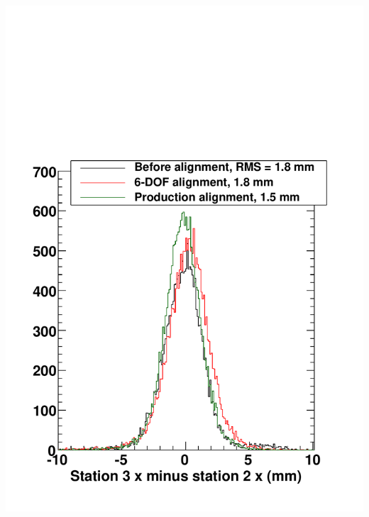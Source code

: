 \documentclass[compress]{beamer}
\begin{document}
\begin{frame}
\begin{columns}
\includegraphics[width=\linewidth]{residuals_xdifffid1cut_23.pdf}

\end{columns}
\end{frame}
\end{document}

